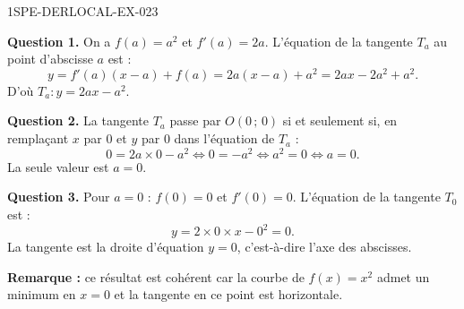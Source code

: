 \begin{corrige}{1SPE-DERLOCAL-EX-023}

\textbf{Question 1.} On a $f(a) = a^2$ et $f'(a) = 2a$. L'équation de la tangente $T_a$ au point d'abscisse $a$ est :
\[
y = f'(a)(x - a) + f(a) = 2a(x - a) + a^2 = 2ax - 2a^2 + a^2.
\]
D'où $\boxed{T_a : y = 2ax - a^2}$.

\textbf{Question 2.} La tangente $T_a$ passe par $O(0\,;\,0)$ si et seulement si, en remplaçant $x$ par $0$ et $y$ par $0$ dans l'équation de $T_a$ :
\[
0 = 2a \times 0 - a^2 \iff 0 = -a^2 \iff a^2 = 0 \iff a = 0.
\]
La seule valeur est $\boxed{a = 0}$.

\textbf{Question 3.} Pour $a = 0$ : $f(0) = 0$ et $f'(0) = 0$. L'équation de la tangente $T_0$ est :
\[
y = 2 \times 0 \times x - 0^2 = 0.
\]
La tangente est la droite d'équation $\boxed{y = 0}$, c'est-à-dire l'axe des abscisses.

\textbf{Remarque :} ce résultat est cohérent car la courbe de $f(x) = x^2$ admet un minimum en $x = 0$ et la tangente en ce point est horizontale.

\end{corrige}

